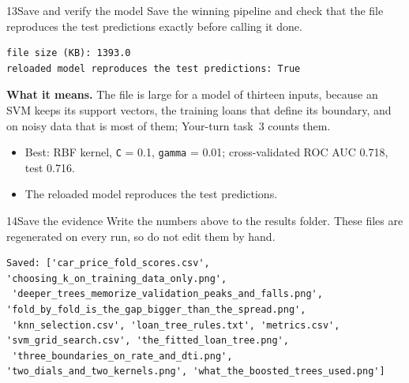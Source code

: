 \begin{labquestion}{13}{Save and verify the model}
Save the winning pipeline and check that the file reproduces the test predictions exactly before calling it done.
\end{labquestion}
\begin{labanswer}

\begin{refoutput}
\begin{lstlisting}[style=utpterminal]
file size (KB): 1393.0
reloaded model reproduces the test predictions: True
\end{lstlisting}
\end{refoutput}

\textbf{What it means.} The file is large for a model of thirteen inputs, because an SVM keeps its support vectors, the training loans that define its boundary, and on noisy data that is most of them; Your-turn task~3 counts them.
\end{labanswer}

\begin{labcheckpoint}
\begin{itemize}[leftmargin=1.2em,itemsep=2pt,topsep=1pt]
  \item Best: RBF kernel, \texttt{C} = 0.1, \texttt{gamma} = 0.01; cross-validated ROC AUC 0.718, test 0.716.
  \item The reloaded model reproduces the test predictions.
\end{itemize}
\end{labcheckpoint}


\begin{labquestion}{14}{Save the evidence}
Write the numbers above to the results folder. These files are regenerated on every run, so do not edit them by hand.
\end{labquestion}
\begin{labanswer}

\begin{refoutput}
\begin{lstlisting}[style=utpterminal]
Saved: ['car_price_fold_scores.csv', 'choosing_k_on_training_data_only.png',
 'deeper_trees_memorize_validation_peaks_and_falls.png', 'fold_by_fold_is_the_gap_bigger_than_the_spread.png',
 'knn_selection.csv', 'loan_tree_rules.txt', 'metrics.csv', 'svm_grid_search.csv', 'the_fitted_loan_tree.png',
 'three_boundaries_on_rate_and_dti.png', 'two_dials_and_two_kernels.png', 'what_the_boosted_trees_used.png']
\end{lstlisting}
\end{refoutput}
\end{labanswer}

